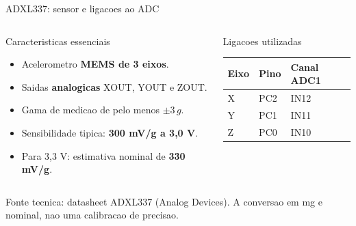 \documentclass[aspectratio=169,10pt]{beamer}
\begin{document}
\begin{frame}{ADXL337: sensor e ligacoes ao ADC}
\begin{columns}[T,onlytextwidth]
\begin{block}{Caracteristicas essenciais}
\begin{itemize}\setlength\itemsep{2pt}
\item Acelerometro \textbf{MEMS de 3 eixos}.
\item Saidas \textbf{analogicas} XOUT, YOUT e ZOUT.
\item Gama de medicao de pelo menos $\pm3\,g$.
\item Sensibilidade tipica: \textbf{300 mV/g a 3,0 V}.
\item Para 3,3 V: estimativa nominal de \textbf{330 mV/g}.
\end{itemize}
\end{block}
\begin{block}{Ligacoes utilizadas}
\centering\begin{tabular}{lll}
\toprule
Eixo & Pino & Canal ADC1\\\midrule
X & PC2 & IN12\\
Y & PC1 & IN11\\
Z & PC0 & IN10\\\bottomrule
\end{tabular}
\end{block}
\vspace{2mm}
\centering
{}
\end{columns}
\vfill
{\footnotesize\color{gray}Fonte tecnica: datasheet ADXL337 (Analog Devices). A conversao em mg e nominal, nao uma calibracao de precisao.}
\end{frame}
\end{document}
